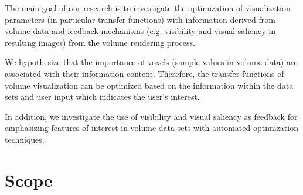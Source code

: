 
The main goal of our research is to investigate the optimization of visualization parameters (in particular transfer functions) with information derived from volume data and feedback mechanisms (e.g. visibility and visual saliency in resulting images) from the volume rendering process.

We hypothesize that the importance of voxels (sample values in volume data) are associated with their information content. Therefore, the transfer functions of volume visualization can be optimized based on the information within the data sets and user input which indicates the user's interest.

In addition, we investigate the use of visibility and visual saliency as feedback for emphasizing features of interest in volume data sets with automated optimization techniques.


\section{Scope}

